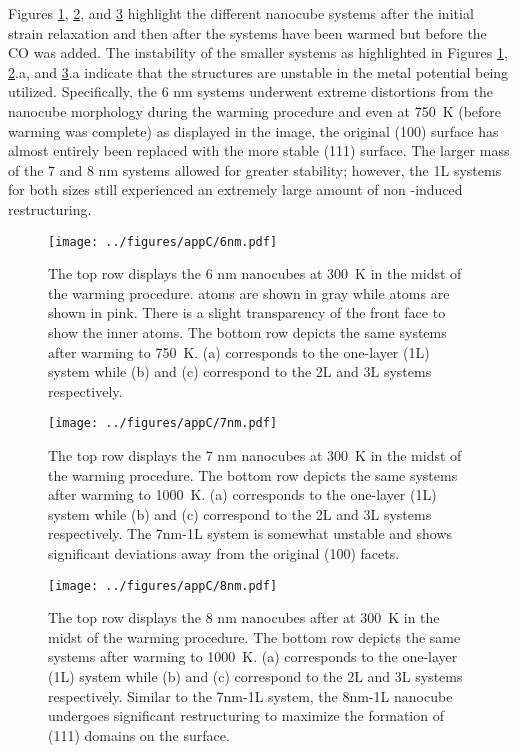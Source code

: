 Figures \ref{fig:6nm}, \ref{fig:7nm}, and \ref{fig:8nm} highlight the different
nanocube systems after the initial strain relaxation and then after the systems
have been warmed but before the CO was added. The instability of the smaller
systems as highlighted in Figures \ref{fig:6nm}, \ref{fig:7nm}.a, and
\ref{fig:8nm}.a indicate that the structures are unstable in the metal
potential being utilized. Specifically, the 6 nm systems underwent extreme
distortions from the nanocube morphology during the warming procedure and even
at 750~K (before warming was complete) as displayed in the image, the original
(100) surface has almost entirely been replaced with the more stable (111)
surface. The larger mass of the 7 and 8 nm systems allowed for greater
stability; however, the 1L systems for both sizes still experienced an
extremely large amount of non -induced restructuring.

\begin{landscape}
\begin{figure}[p!]
\centering
  \texttt{[image: ../figures/appC/6nm.pdf]}
  \caption{The top row displays the 6 nm nanocubes at 300~K in the midst of the
warming procedure.   atoms are shown in gray while  atoms are
shown in pink.  There is a slight transparency of the front  face to
show the inner  atoms. The bottom row depicts the same systems after
warming to 750~K.  (a) corresponds to the one-layer (1L) system while (b) and
(c) correspond to the 2L and 3L systems respectively.}
  \label{fig:6nm}
\end{figure}
\end{landscape}

\begin{landscape}
\begin{figure}[p!]
\centering
  \texttt{[image: ../figures/appC/7nm.pdf]}
  \caption{The top row displays the 7 nm nanocubes at 300~K in the midst of the warming procedure.
The bottom row depicts the same systems after warming to
1000~K.  (a) corresponds to the one-layer (1L) system while (b) and (c)
correspond to the 2L and 3L systems respectively. The 7nm-1L system is somewhat
unstable and shows significant deviations away from the original (100) facets.}
  \label{fig:7nm}
\end{figure}
\end{landscape}

\begin{landscape}
\begin{figure}[p!]
\centering
  \texttt{[image: ../figures/appC/8nm.pdf]}
  \caption{The top row displays the 8 nm nanocubes after at 300~K in the midst of the warming procedure. 
The bottom row depicts the same systems after warming to
1000~K.  (a) corresponds to the one-layer (1L) system while (b) and (c)
correspond to the 2L and 3L systems respectively. Similar to the 7nm-1L system,
the 8nm-1L nanocube undergoes significant restructuring to maximize the
formation of (111) domains on the surface.}
  \label{fig:8nm}
\end{figure}
\end{landscape}



